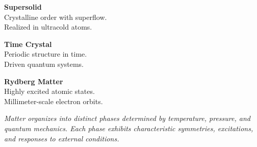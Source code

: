 \begin{tcolorbox}
\begin{multicols}{2}
\textbf{Supersolid}\\
{\footnotesize Crystalline order with superflow.\\Realized in ultracold atoms.}\vspace{6pt}

\textbf{Time Crystal}\\
{\footnotesize Periodic structure in time.\\Driven quantum systems.}\vspace{6pt}

\textbf{Rydberg Matter}\\
{\footnotesize Highly excited atomic states.\\Millimeter-scale electron orbits.}

\end{multicols}

\vspace{6pt}
{\footnotesize\color{blue!70}\textit{Matter organizes into distinct phases determined by temperature, pressure, and quantum mechanics. Each phase exhibits characteristic symmetries, excitations, and responses to external conditions.}}

\end{tcolorbox}
    
